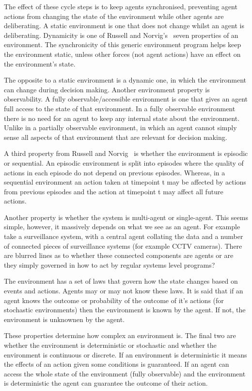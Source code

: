\documentclass[]{final_report}
\begin{document}
The effect of these cycle steps is to keep agents synchronised, preventing agent actions from changing the state of the environment while other agents are deliberating. A static environment is one that does not change whilst an agent is deliberating. Dynamicity is one of Russell and Norvig's~\cite{russell2016artificial} seven properties of an environment. The synchronicity of this generic environment program helps keep the environment static, unless other forces (not agent actions) have an effect on the environment's state.\par 
The opposite to a static environment is a dynamic one, in which the environment can change during decision making. Another environment property is observability. A fully observable/accessible environment is one that gives an agent full access to the state of that environment. In a fully observable environment there is no need for an agent to keep any internal state about the environment. Unlike in a partially observable environment, in which an agent cannot simply sense all aspects of that environment that are relevant for decision making.\par 
A third property from Russell and Norvig~\cite{russell2016artificial} is whether the environment is episodic or sequential. An episodic environment is split into episodes where the quality of actions in each episode do not depend on previous episodes. Whereas, in a sequential environment an action taken at timepoint t may be affected by actions from previous episodes and the action at timepoint t may affect all future actions.\par 
Another property is whether the system is multi-agent or single-agent. This seems simple, however, it massively depends on what we see as an agent. For example take a surveillance system, with a central agent collating the data and a number of connected pieces of surveillance systems (for example CCTV cameras). There are blurred lines as to whether these connected components are agents or are they simply governed in how to act by regular systems level programs?\par 
The environment has a set of laws that govern how the state changes based on events and actions. Agents may or may not know these laws. It is said that if an agent knows the outcome or probability of the outcome of it's actions (for stochastic environments) then the environment is known by the agent. If not, the environment is unknownen by the agent.\par 
These properties determine how complex an environment is. The final two are whether the environment is deterministic or stochastic and whether the environment is continuous or discrete. If an environment is deterministic it means the effects of an action given some conditions is guaranteed. If an agent can access the whole state of the environment (fully observable) and the environment is deterministic the agent can guarantee the outcome of their action.\par 
\end{document}

